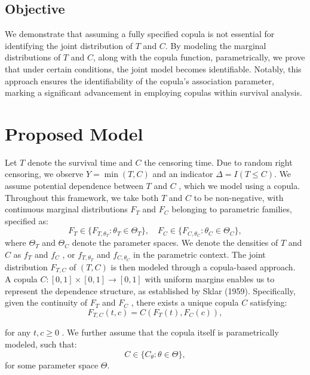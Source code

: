 \subsection{Objective}
We demonstrate that assuming a fully specified copula is not essential for identifying the joint distribution of  $T$  and  $C$. By modeling the marginal distributions of  $T$  and  $C$, along with the copula function, parametrically, we prove that under certain conditions, the joint model becomes identifiable. Notably, this approach ensures the identifiability of the copula’s association parameter, marking a significant advancement in employing copulas within survival analysis.

\section{Proposed Model}
Let  $T$  denote the survival time and  $C$  the censoring time. Due to random right censoring, we observe  $Y = \min(T, C)$  and an indicator  $\Delta = I(T \leq C)$. We assume potential dependence between  $T$  and  $C$ , which we model using a copula. Throughout this framework\cite{10.1093/biomet/asac067}, we take both  $T$  and  $C$  to be non-negative, with continuous marginal distributions  $F_T$  and  $F_C$  belonging to parametric families, specified as:
\begin{equation}
	F_T \in \{ F_{T, \theta_T} : \theta_T \in \Theta_T \}, \quad F_C \in \{ F_{C, \theta_C} : \theta_C \in \Theta_C \},
\end{equation}
where  $\Theta_T$  and  $\Theta_C$  denote the parameter spaces. We denote the densities of  $T$  and  $C$  as  $f_T$  and  $f_C$ , or  $f_{T, \theta_T}$  and  $f_{C, \theta_C}$  in the parametric context. The joint distribution  $F_{T, C}$  of  $(T, C)$  is then modeled through a copula-based approach. \\
A copula  $C : [0,1] \times [0,1] \to [0,1]$  with uniform margins enables us to represent the dependence structure, as established by Sklar (1959)\cite{sklar}. Specifically, given the continuity of  $F_T$  and  $F_C$ , there exists a unique copula  $C$  satisfying:
\begin{equation}
	F_{T,C}(t, c) = C(F_T(t), F_C(c)),
\end{equation}

for any  $t, c \geq 0$ . We further assume that the copula itself is parametrically modeled, such that: 
\begin{equation}
	C \in \{ C_\theta : \theta \in \Theta \},
\end{equation}
 for some parameter space  $\Theta$.


